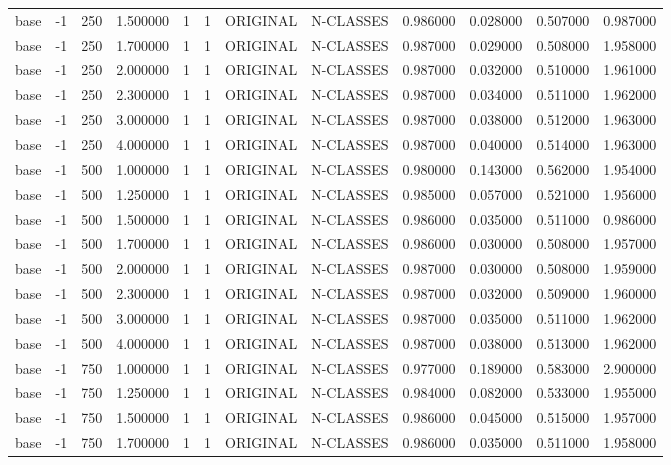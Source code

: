 \begin{tabular}{lrrrllllrrrr}
base & -1 & 250 & 1.500000 & 1 & 1 & ORIGINAL & N-CLASSES & 0.986000 & 0.028000 & 0.507000 & 0.987000 \\
base & -1 & 250 & 1.700000 & 1 & 1 & ORIGINAL & N-CLASSES & 0.987000 & 0.029000 & 0.508000 & 1.958000 \\
base & -1 & 250 & 2.000000 & 1 & 1 & ORIGINAL & N-CLASSES & 0.987000 & 0.032000 & 0.510000 & 1.961000 \\
base & -1 & 250 & 2.300000 & 1 & 1 & ORIGINAL & N-CLASSES & 0.987000 & 0.034000 & 0.511000 & 1.962000 \\
base & -1 & 250 & 3.000000 & 1 & 1 & ORIGINAL & N-CLASSES & 0.987000 & 0.038000 & 0.512000 & 1.963000 \\
base & -1 & 250 & 4.000000 & 1 & 1 & ORIGINAL & N-CLASSES & 0.987000 & 0.040000 & 0.514000 & 1.963000 \\
base & -1 & 500 & 1.000000 & 1 & 1 & ORIGINAL & N-CLASSES & 0.980000 & 0.143000 & 0.562000 & 1.954000 \\
base & -1 & 500 & 1.250000 & 1 & 1 & ORIGINAL & N-CLASSES & 0.985000 & 0.057000 & 0.521000 & 1.956000 \\
base & -1 & 500 & 1.500000 & 1 & 1 & ORIGINAL & N-CLASSES & 0.986000 & 0.035000 & 0.511000 & 0.986000 \\
base & -1 & 500 & 1.700000 & 1 & 1 & ORIGINAL & N-CLASSES & 0.986000 & 0.030000 & 0.508000 & 1.957000 \\
base & -1 & 500 & 2.000000 & 1 & 1 & ORIGINAL & N-CLASSES & 0.987000 & 0.030000 & 0.508000 & 1.959000 \\
base & -1 & 500 & 2.300000 & 1 & 1 & ORIGINAL & N-CLASSES & 0.987000 & 0.032000 & 0.509000 & 1.960000 \\
base & -1 & 500 & 3.000000 & 1 & 1 & ORIGINAL & N-CLASSES & 0.987000 & 0.035000 & 0.511000 & 1.962000 \\
base & -1 & 500 & 4.000000 & 1 & 1 & ORIGINAL & N-CLASSES & 0.987000 & 0.038000 & 0.513000 & 1.962000 \\
base & -1 & 750 & 1.000000 & 1 & 1 & ORIGINAL & N-CLASSES & 0.977000 & 0.189000 & 0.583000 & 2.900000 \\
base & -1 & 750 & 1.250000 & 1 & 1 & ORIGINAL & N-CLASSES & 0.984000 & 0.082000 & 0.533000 & 1.955000 \\
base & -1 & 750 & 1.500000 & 1 & 1 & ORIGINAL & N-CLASSES & 0.986000 & 0.045000 & 0.515000 & 1.957000 \\
base & -1 & 750 & 1.700000 & 1 & 1 & ORIGINAL & N-CLASSES & 0.986000 & 0.035000 & 0.511000 & 1.958000 \\

\end{tabular}
